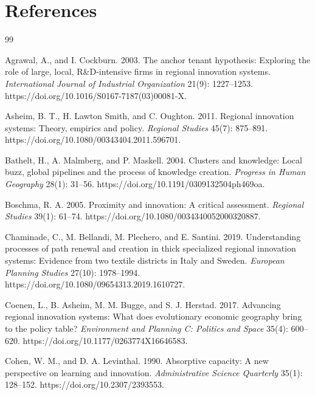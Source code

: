 \section*{References}
\begin{thebibliography}{99}
\providecommand{\natexlab}[1]{#1}
\providecommand{\url}[1]{\texttt{#1}}
\providecommand{\doi}[1]{https://doi.org/#1}

Agrawal, A., and I. Cockburn. 2003. The anchor tenant hypothesis: Exploring the role of large, local, R\&D-intensive firms in regional innovation systems. \emph{International Journal of Industrial Organization} 21(9): 1227--1253. \doi{10.1016/S0167-7187(03)00081-X}.

Asheim, B. T., H. Lawton Smith, and C. Oughton. 2011. Regional innovation systems: Theory, empirics and policy. \emph{Regional Studies} 45(7): 875--891. \doi{10.1080/00343404.2011.596701}.

Bathelt, H., A. Malmberg, and P. Maskell. 2004. Clusters and knowledge: Local buzz, global pipelines and the process of knowledge creation. \emph{Progress in Human Geography} 28(1): 31--56. \doi{10.1191/0309132504ph469oa}.

Boschma, R. A. 2005. Proximity and innovation: A critical assessment. \emph{Regional Studies} 39(1): 61--74. \doi{10.1080/0034340052000320887}.

Chaminade, C., M. Bellandi, M. Plechero, and E. Santini. 2019. Understanding processes of path renewal and creation in thick specialized regional innovation systems: Evidence from two textile districts in Italy and Sweden. \emph{European Planning Studies} 27(10): 1978--1994. \doi{10.1080/09654313.2019.1610727}.

Coenen, L., B. Asheim, M. M. Bugge, and S. J. Herstad. 2017. Advancing regional innovation systems: What does evolutionary economic geography bring to the policy table? \emph{Environment and Planning C: Politics and Space} 35(4): 600--620. \doi{10.1177/0263774X16646583}.

Cohen, W. M., and D. A. Levinthal. 1990. Absorptive capacity: A new perspective on learning and innovation. \emph{Administrative Science Quarterly} 35(1): 128--152. \doi{10.2307/2393553}.


\end{thebibliography}

